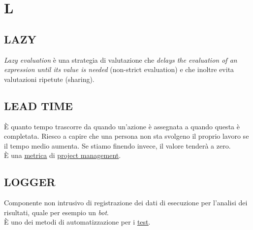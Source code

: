 \newpage
	\section{L} \label{sec:L}

		\subsection{LAZY}  \label{lazy}
		\textit{Lazy evaluation} è una strategia di valutazione che \textit{delays the evaluation of an expression until its value is needed} (non-strict evaluation) e che inoltre evita valutazioni ripetute (sharing).


		\subsection{LEAD TIME}	 \label{leadtime}
		È quanto tempo trascorre da quando un'azione è assegnata a quando questa è completata. Riesco a capire che una persona non sta svolgeno il proprio lavoro se il tempo medio aumenta. Se stiamo finendo invece, il valore tenderà a zero. \\
		È una \underline{\hyperref[metrica]{metrica}} di \underline{\hyperref[gestioneprogetto]{project management}}.


		\subsection{LOGGER}		\label{logger}
		Componente non intrusivo di registrazione dei dati di esecuzione per l'analisi dei risultati, quale per esempio un \textit{bot}. \\
		È uno dei metodi di automatizzazione per i \underline{\hyperref[test]{test}}.
